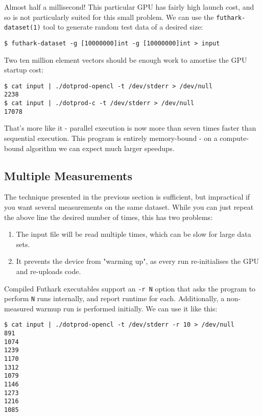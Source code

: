 \documentclass[oneside,11pt]{book}
\begin{document}
Almost half a millisecond!  This particular GPU has fairly high launch
cost, and so is not particularly suited for this small problem.  We
can use the \texttt{futhark-dataset(1)} tool to generate random test
data of a desired size:

\begin{verbatim}
$ futhark-dataset -g [10000000]int -g [10000000]int > input
\end{verbatim}

Two ten million element vectors should be enough work to amortise the
GPU startup cost:

\begin{verbatim}
$ cat input | ./dotprod-opencl -t /dev/stderr > /dev/null
2238
$ cat input | ./dotprod-c -t /dev/stderr > /dev/null
17078
\end{verbatim}

That's more like it - parallel execution is now more than seven times
faster than sequential execution.  This program is entirely
memory-bound - on a compute-bound algorithm we can expect much larger
speedups.

\subsection{Multiple Measurements}

The technique presented in the previous section is sufficient, but
impractical if you want several measurements on the same dataset.
While you can just repeat the above line the desired number of times,
this has two problems:

\begin{enumerate}
\item The input file will be read multiple times, which can be slow
  for large data sets.
\item It prevents the device from "warming up", as every run
  re-initialises the GPU and re-uploads code.
\end{enumerate}

Compiled Futhark executables support an \texttt{-r N} option that asks
the program to perform \texttt{N} runs internally, and report runtime
for each.  Additionally, a non-measured warmup run is performed
initially.  We can use it like this:

\begin{verbatim}
$ cat input | ./dotprod-opencl -t /dev/stderr -r 10 > /dev/null
891
1074
1239
1170
1312
1079
1146
1273
1216
1085
\end{verbatim}
\end{document}
